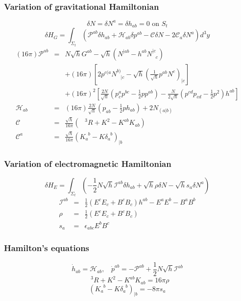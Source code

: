 \subsubsection{Variation of gravitational Hamiltonian}
\[\delta N = \delta N^a = \delta h_{ab} = 0 \mbox{ on } S_t\]
\[\delta H_G = \int_{\Sigma_t} (\mathcal{P}^{ab} \delta h_{ab} + \mathcal{H}_{ab} \delta p^{ab} - \mathcal{C}\delta N - 2\mathcal{C}_a \delta N^a) d^3 y\]
\begin{eqnarray}
(16\pi)\mathcal{P}^{ab} &=&  N\sqrt{h}G^{ab} - \sqrt{h}(N^{|ab} - h^{ab} N^{|c}_{\phantom{|c}c}) \nonumber \\
&\phantom{=}& +(16\pi)[2p^{c(a}N^{b)}_{\phantom{b)}|c} - \sqrt{h}(\frac{1}{\sqrt{h}}p^{ab}N^c)_{|c}] \nonumber \\
&\phantom{=}& + (16\pi)^2 [\frac{2N}{\sqrt{h}} (p^a_c p^{bc} - \frac{1}{2} p p^{ab}) - \frac{N}{2\sqrt{h}}(p^{cd}p_{cd} - \frac{1}{2} p^2)h^{ab}] \nonumber \\
\mathcal{H}_{ab} &=& (16\pi) \frac{2N}{\sqrt{h}} (p_{ab} - \frac{1}{2}p h_{ab}) + 2N_{(a|b)} \nonumber \\
\mathcal{C} &=& \frac{\sqrt{h}}{16\pi} (\phantom{R}^3R + K^2 - K^{ab}K_{ab}) \nonumber \\
\mathcal{C}^a &=& \frac{\sqrt{h}}{16\pi} (K_a^{\phantom{a}b} - K \delta_a^{\phantom{a}b})_{|b} \nonumber 
\end{eqnarray}

\subsubsection{Variation of electromagnetic Hamiltonian}
\[\delta H_E = \int_{\Sigma_t}(-\frac{1}{2}N\sqrt{h}\mathcal{I}^{ab} \delta h_{ab} + \sqrt{h} \rho \delta N - \sqrt{h} s_a \delta N^a)\]
\begin{eqnarray}
\mathcal{I}^{ab} &=& \frac{1}{2}(E^c E_c + B^c B_c)h^{ab} - E^a E^b - B^a B^b \nonumber \\
\rho &=& \frac{1}{2}(E^c E_c + B^c B_c) \nonumber \\
s_a &=& \epsilon_{abc} E^b B^c \nonumber
\end{eqnarray}

\subsubsection{Hamilton's equations}
\[\dot{h}_{ab} = \mathcal{H}_{ab}, \ \ \ \ \dot{p}^{ab} = -\mathcal{P}^{ab}+\frac{1}{2}N\sqrt{h}\mathcal{I}^{ab}\]
\[\phantom{R}^3R + K^2 - K^{ab}K_{ab} = 16 \pi \rho\]
\[(K_a^{\phantom{a}b} - K \delta_a^{\phantom{a}b})_{|b} = -8\pi s_a\]


